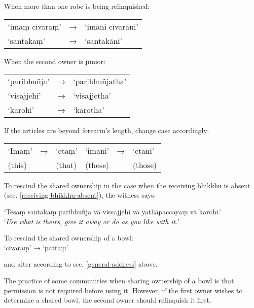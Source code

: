 
When more than one robe is being relinquished:

\begin{tabular}{@{}lll@{}}
‘imaṃ cīvaraṃ’ & → & ‘imāni cīvarāni’\\
‘santakaṃ’ & → & ‘santakāni’\\
\end{tabular}

When the second owner is junior:

\begin{tabular}{@{}lll@{}}
‘paribhuñja’ & → & ‘paribhuñjatha’\\
‘visajjehi’ & → & ‘visajjetha’\\
‘karohi’ & → & ‘karotha’\\
\end{tabular}

If the articles are beyond forearm's length, change case accordingly:

\begin{tabular}{@{}llllll@{}}
‘Imaṃ’ & → & ‘etaṃ’ & ‘imāni’ & → & ‘etāni’\\
(this) &   & (that) & (these) &   & (those)\\
\end{tabular}

To rescind the shared ownership in the case when the receiving bhikkhu is absent
(sec. \ref{receiving-bhikkhu-absent}), the witness says:

‘Tesaṃ santakaṃ paribhuñja vā vissajjehi vā yathāpaccayaṃ vā karohi.’\\
‘\emph{Use what is theirs, give it away or do as you like with it.}’

To rescind the shared ownership of a bowl:\\
‘cīvaraṃ’ → ‘pattaṃ’

and alter according to sec. \ref{general-address} above.

The practice of some communities when sharing ownership of a bowl is that
permission is not required before using it. However, if the first owner wishes
to determine a shared bowl, the second owner should relinquish it first.

